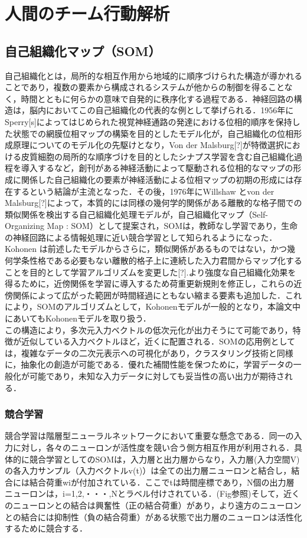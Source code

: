 \chapter{人間のチーム行動解析}

\section{自己組織化マップ（SOM）}
自己組織化とは，局所的な相互作用から地域的に順序づけられた構造が導かれることであり，複数の要素から構成されるシステムが他からの制御を得ることなく，時間とともに何らかの意味で自発的に秩序化する過程である．神経回路の構造は，脳内においてこの自己組織化の代表的な例として挙げられる．1956年にSperry[s]によってはじめられた視覚神経通路の発達における位相的順序を保持した状態での網膜位相マップの構築を目的としたモデル化が，自己組織化の位相形成原理についてのモデル化の先駆けとなり，Von der Malsburg[?]が特徴選択における皮質細胞の局所的な順序づけを目的としたシナプス学習を含む自己組織化過程を導入するなど，創刊がある神経活動によって駆動される位相的なマップの形成に関係した自己組織化の要素が神経活動による位相マップの初期の形成には存在するという結論が主流となった．その後，1976年にWillshaw とvon der Malsburg[?]によって，本質的には同様の幾何学的関係がある離散的な格子間での類似関係を検出する自己組織化処理モデルが，自己組織化マップ（Self-Organizing Map : SOM）として提案され，SOMは，教師なし学習であり，生命の神経回路による情報処理に近い競合学習として知られるようになった．\\
Kohonen は前述したモデルからさらに，類似関係があるものではない，かつ幾何学条性格である必要もない離散的格子上に連続した入力君間からマップ化することを目的として学習アルゴリズムを変更した[?].より強度な自己組織化効果を得るために，近傍関係を学習に導入するため荷重更新規則を修正し，これらの近傍関係によって広がった範囲が時間経過にともない縮まる要素も追加した．これにより，SOMのアルゴリズムとして，Kohonenモデルが一般的となり，本論文中にあいてもKohonenモデルを取り扱う．\\
この構造により，多次元入力ベクトルの低次元化が出力そうにて可能であり，特徴が近似している入力ベクトルほど，近くに配置される．SOMの応用例としては，複雑なデータの二次元表示への可視化があり，クラスタリング技術と同様に，抽象化の創造が可能である．優れた補間性能を保つために，学習データの一般化が可能であり，未知な入力データに対しても妥当性の高い出力が期待される．
\subsection{競合学習}
競合学習は階層型ニューラルネットワークにおいて重要な懸念である．同一の入力に対し，各々のニューロンが活性度を競い合う側方相互作用が利用される．具体的に競合学習としてのSOMは，入力層と出力層からなり，入力層(入力空間V)の各入力サンプル（入力ベクトルv(t)）は全ての出力層ニューロンと結合し，結合には結合荷重wiが付加されている．ここでtは時間座標であり，N個の出力層ニューロンは，i=1,2,・・・,Nとラベル付けされている．(Fig参照)そして，近くのニューロンとの結合は興奮性（正の結合荷重）があり，より遠方のニューロンとの結合には抑制性（負の結合荷重）がある状態で出力層のニューロンは活性化するために競合する．
